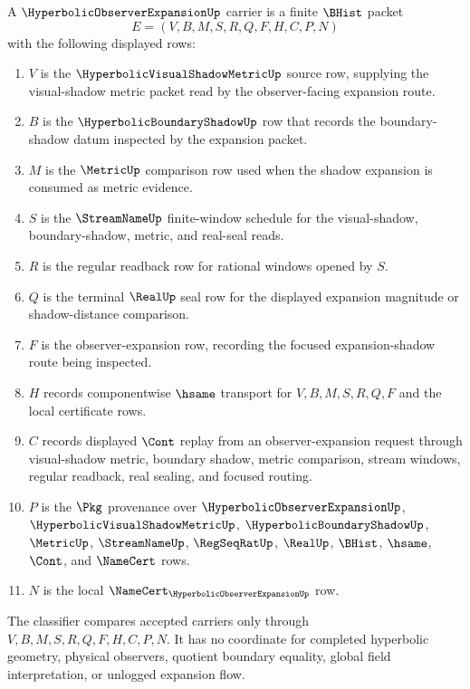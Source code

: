 \begin{definition}
\label{def:hyperbolic-observer-expansion-carrier}
A $\HyperbolicObserverExpansionUp$ carrier is a finite $\BHist$ packet
$$
E=(V,B,M,S,R,Q,F,H,C,P,N)
$$
with the following displayed rows:
\begin{enumerate}
\item $V$ is the $\HyperbolicVisualShadowMetricUp$ source row, supplying the visual-shadow metric packet read by the observer-facing expansion route.
\item $B$ is the $\HyperbolicBoundaryShadowUp$ row that records the boundary-shadow datum inspected by the expansion packet.
\item $M$ is the $\MetricUp$ comparison row used when the shadow expansion is consumed as metric evidence.
\item $S$ is the $\StreamNameUp$ finite-window schedule for the visual-shadow, boundary-shadow, metric, and real-seal reads.
\item $R$ is the regular readback row for rational windows opened by $S$.
\item $Q$ is the terminal $\RealUp$ seal row for the displayed expansion magnitude or shadow-distance comparison.
\item $F$ is the observer-expansion row, recording the focused expansion-shadow route being inspected.
\item $H$ records componentwise $\hsame$ transport for $V,B,M,S,R,Q,F$ and the local certificate rows.
\item $C$ records displayed $\Cont$ replay from an observer-expansion request through visual-shadow metric, boundary shadow, metric comparison, stream windows, regular readback, real sealing, and focused routing.
\item $P$ is the $\Pkg$ provenance over $\HyperbolicObserverExpansionUp$, $\HyperbolicVisualShadowMetricUp$, $\HyperbolicBoundaryShadowUp$, $\MetricUp$, $\StreamNameUp$, $\RegSeqRatUp$, $\RealUp$, $\BHist$, $\hsame$, $\Cont$, and $\NameCert$ rows.
\item $N$ is the local $\NameCert_{\HyperbolicObserverExpansionUp}$ row.
\end{enumerate}
The classifier compares accepted carriers only through $V,B,M,S,R,Q,F,H,C,P,N$. It has no coordinate for completed hyperbolic geometry, physical observers, quotient boundary equality, global field interpretation, or unlogged expansion flow.
\end{definition}

